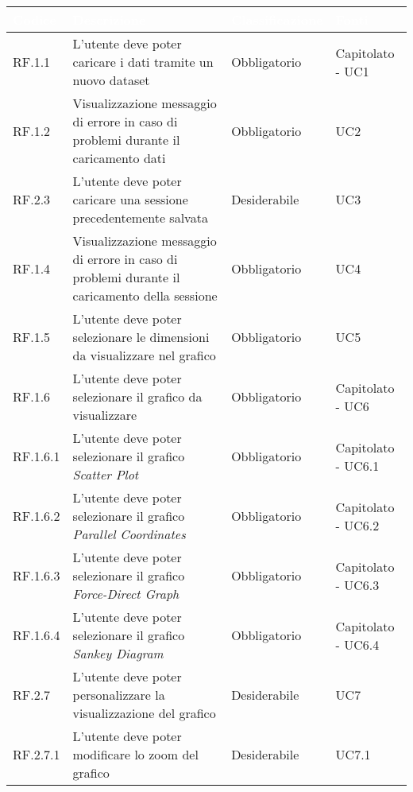 \begin{center}
  \centering
  \begin{longtable}{|L{1,5cm}|C{5,5cm}|C{3cm}|C{2cm}|}
    \hline
    \textcolor[HTML]{FFFFFF}{\textbf{Codice}} & \textcolor[HTML]{FFFFFF}{\textbf{Descrizione}} & \textcolor[HTML]{FFFFFF}{\textbf{Classificazione}} & \textcolor[HTML]{FFFFFF}{\textbf{Fonti}}
    \\ \hline
    RF.1.1 & L'utente deve poter caricare i dati tramite un nuovo dataset & Obbligatorio & Capitolato - UC1 \\ \hline
    RF.1.2 & Visualizzazione messaggio di errore in caso di problemi durante il caricamento dati & Obbligatorio & UC2 \\ \hline
    RF.2.3 & L'utente deve poter caricare una sessione precedentemente salvata & Desiderabile & UC3 \\ \hline
    RF.1.4 & Visualizzazione messaggio di errore in caso di problemi durante il caricamento della sessione & Obbligatorio & UC4 \\ \hline
    RF.1.5 & L'utente deve poter selezionare le dimensioni da visualizzare nel grafico & Obbligatorio & UC5 \\ \hline
    RF.1.6 & L'utente deve poter selezionare il grafico da visualizzare & Obbligatorio & Capitolato - UC6 \\ \hline
    RF.1.6.1 & L'utente deve poter selezionare il grafico \textit{Scatter Plot} & Obbligatorio & Capitolato - UC6.1 \\ \hline
    RF.1.6.2 & L'utente deve poter selezionare il grafico \textit{Parallel Coordinates} & Obbligatorio & Capitolato - UC6.2 \\ \hline
    RF.1.6.3 & L'utente deve poter selezionare il grafico \textit{Force-Direct Graph} & Obbligatorio & Capitolato - UC6.3 \\ \hline
    RF.1.6.4 & L'utente deve poter selezionare il grafico \textit{Sankey Diagram} & Obbligatorio & Capitolato - UC6.4 \\ \hline
    RF.2.7 & L'utente deve poter personalizzare la visualizzazione del grafico & Desiderabile & UC7 \\ \hline
    RF.2.7.1 & L'utente deve poter modificare lo zoom del grafico & Desiderabile & UC7.1 \\ \hline

\end{longtable}
\end{center}
